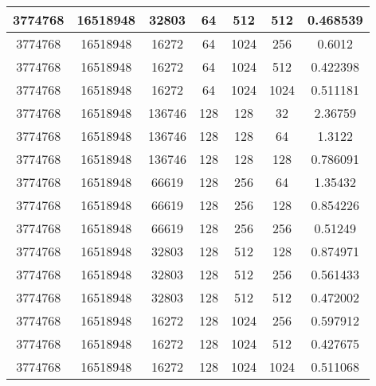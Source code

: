 \documentclass[9pt]{article}
\begin{document}
\begin{tabular}{|c|c|c|c|c|c|c| }
\hline
3774768  & 16518948  & 32803  & 64  & 512  & 512  & 0.468539 \\
\hline
3774768  & 16518948  & 16272  & 64  & 1024  & 256  & 0.6012 \\
\hline
3774768  & 16518948  & 16272  & 64  & 1024  & 512  & 0.422398 \\
\hline
3774768  & 16518948  & 16272  & 64  & 1024  & 1024  & 0.511181 \\
\hline
3774768  & 16518948  & 136746  & 128  & 128  & 32  & 2.36759 \\
\hline
3774768  & 16518948  & 136746  & 128  & 128  & 64  & 1.3122 \\
\hline
3774768  & 16518948  & 136746  & 128  & 128  & 128  & 0.786091 \\
\hline
3774768  & 16518948  & 66619  & 128  & 256  & 64  & 1.35432 \\
\hline
3774768  & 16518948  & 66619  & 128  & 256  & 128  & 0.854226 \\
\hline
3774768  & 16518948  & 66619  & 128  & 256  & 256  & 0.51249 \\
\hline
3774768  & 16518948  & 32803  & 128  & 512  & 128  & 0.874971 \\
\hline
3774768  & 16518948  & 32803  & 128  & 512  & 256  & 0.561433 \\
\hline
3774768  & 16518948  & 32803  & 128  & 512  & 512  & 0.472002 \\
\hline
3774768  & 16518948  & 16272  & 128  & 1024  & 256  & 0.597912 \\
\hline
3774768  & 16518948  & 16272  & 128  & 1024  & 512  & 0.427675 \\
\hline
3774768  & 16518948  & 16272  & 128  & 1024  & 1024  & 0.511068 \\
\hline
\end{tabular}
 
\end{document}
